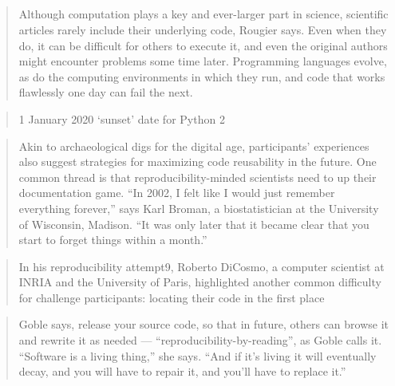 \subsection{\cite{perkel_challenge_2020}}

\begin{quotation}
    Although computation plays a key and ever-larger part in science, scientific
    articles rarely include their underlying code, Rougier says. Even when they
    do, it can be difficult for others to execute it, and even the original
    authors might encounter problems some time later. Programming languages
    evolve, as do the computing environments in which they run, and code that
    works flawlessly one day can fail the next.
\end{quotation}

\begin{quotation}
1 January 2020 ‘sunset’ date for Python 2
\end{quotation}

\begin{quotation}
Akin to archaeological digs for the digital age, participants’ experiences also
suggest strategies for maximizing code reusability in the future. One common
thread is that reproducibility-minded scientists need to up their documentation
game. “In 2002, I felt like I would just remember everything forever,” says Karl
Broman, a biostatistician at the University of Wisconsin, Madison. “It was only
later that it became clear that you start to forget things within a month.”
\end{quotation}

\begin{quotation}
In his reproducibility attempt9, Roberto DiCosmo, a computer scientist at INRIA
and the University of Paris, highlighted another common difficulty for challenge
participants: locating their code in the first place
\end{quotation}
\begin{quotation}
Goble says, release your source code, so that in future, others can browse it
and rewrite it as needed — “reproducibility-by-reading”, as Goble calls it.
“Software is a living thing,” she says. “And if it’s living it will eventually
decay, and you will have to repair it, and you’ll have to replace it.”
\end{quotation}

